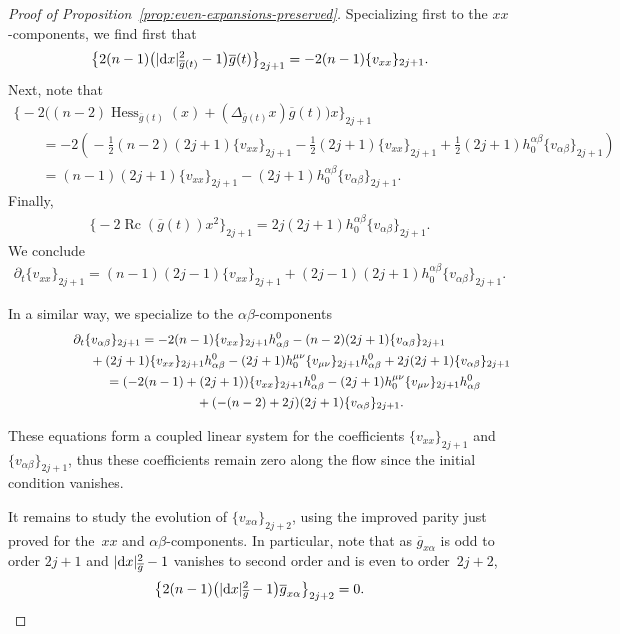 \documentclass[pdftex]{sigma}
\numberwithin{equation}{section}
\newcommand{\del}{\partial}
\newcommand{\olg}{\overline{g}}
\newcommand{\gbar}{\overline{g}}
\DeclareMathOperator{\Rc}{Rc}
\DeclareMathOperator{\hess}{Hess}
\begin{document}
\begin{proof}[Proof of Proposition~\ref{prop:even-expansions-preserved}]
Specializing first to the $xx$-components, we find first that
\[ \big\{ 2 (n-1) \big(|{\rm d}x|^2_{\gbar(t)} -1\big) \olg(t)\big\}_{2j+1} = -2(n-1) \{v_{xx}\}_{2j+1}. \]
Next, note that
\begin{gather*}
 \big\{ {-}2 \big( (n-2) \hess_{\olg(t)} (x) + (\Delta_{\olg(t)} x) \olg(t) \big) x\big\}_{2j+1} \\
\qquad{} = - 2\left(\!- \frac{1}{2} (n-2)(2j+1) \{ v_{xx} \}_{2j+1} - \frac{1}{2} (2j+1) \{ v_{xx} \}_{2j+1} + \frac{1}{2} (2j+1) h^{\alpha \beta}_0 \{v_{\alpha \beta}\}_{2j+1} \!\right) \\
 \qquad{} = (n-1) (2j+1) \{ v_{xx} \}_{2j+1} - (2j+1) h^{\alpha \beta}_0 \{v_{\alpha \beta}\}_{2j+1}.
\end{gather*}
Finally,
\begin{gather*}
\big\{ {-}2 \Rc(\gbar(t)) x^2 \big\}_{2j+1} = 2j( 2j+1) h^{\alpha \beta}_0 \{v_{\alpha \beta}\}_{2j+1}.
\end{gather*}
We conclude
\begin{gather*}
\del_t \{ v_{xx} \}_{2j+1} = (n-1)(2j-1) \{v_{xx}\}_{2j+1} + (2j-1)(2j+1) h^{\alpha \beta}_0 \{v_{\alpha \beta}\}_{2j+1}.
\end{gather*}

In a similar way, we specialize to the $\alpha \beta$-components
\begin{gather*}
 \del_t \{ v_{\alpha \beta} \}_{2j+1} = -2(n-1) \{v_{xx}\}_{2j+1} h^0_{\alpha \beta} - (n-2)(2j+1) \{ v_{\alpha \beta}\}_{2j+1} \nonumber \\
\hphantom{\del_t \{ v_{\alpha \beta} \}_{2j+1} =}{} + (2j+1) \{v_{xx}\}_{2j+1} h^0_{\alpha \beta} - (2j+1) h_0^{\mu \nu} \{v_{\mu\nu}\}_{2j+1} h^0_{\alpha \beta} + 2j(2j+1) \{v_{\alpha \beta}\}_{2j+1}\\
\hphantom{\del_t \{ v_{\alpha \beta} \}_{2j+1}}{} = (-2(n-1) + (2j+1)) \{v_{xx}\}_{2j+1} h^0_{\alpha \beta} - (2j+1) h_0^{\mu \nu} \{v_{\mu\nu}\}_{2j+1} h^0_{\alpha \beta}\\
\hphantom{\del_t \{ v_{\alpha \beta} \}_{2j+1} =}{} + ( -(n-2) + 2j )(2j+1) \{ v_{\alpha \beta}\}_{2j+1}.
\end{gather*}

These equations form a coupled linear system for the coefficients $\{v_{xx}\}_{2j+1}$ and $\{ v_{\alpha \beta} \}_{2j+1}$, thus these coefficients remain zero along the flow since the initial condition vanishes.

It remains to study the evolution of $\{v_{x \alpha}\}_{2j+2}$, using the improved parity just proved for the~$xx$ and $\alpha \beta$-components. In particular, note that as $\gbar_{x \alpha}$ is odd to order $2j+1$ and $|{\rm d}x|^2_{\gbar}-1$ vanishes to second order and is even to order~$2j+2$,
\[ \big\{ 2 (n-1) \big(|{\rm d}x|^2_{\gbar} -1\big) \olg_{x\alpha}\big\}_{2j+2} = 0. \]


\end{proof}
\end{document}
